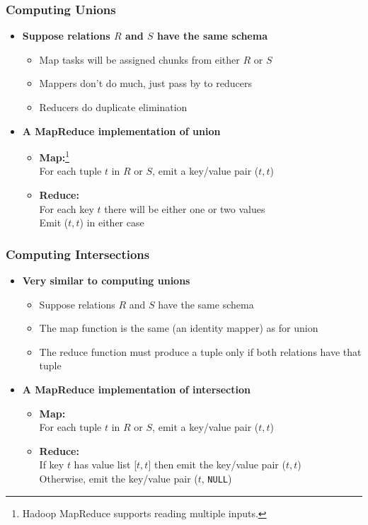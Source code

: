 \documentclass{beamer}
\newcommand{\bi}{\begin{itemize}}
\newcommand{\ei}{\end{itemize}}
\newcommand{\ii}{\item}
\newcommand*{\mygreen}[1]{\textcolor{mygreen}{#1}}
\begin{document}

\begin{frame}
\frametitle{Computing Unions}
\bi
\ii \textbf{Suppose relations $R$ and $S$ have the same schema}
\bi
\ii Map tasks will be assigned chunks from either $R$ or $S$
\ii Mappers don’t do much, just pass by to reducers
\ii Reducers do duplicate elimination
\ei
\ei

\bi
\ii \textbf{A MapReduce implementation of union}
\bi
\ii \mygreen{\textbf{Map:}}\footnote{Hadoop MapReduce supports reading multiple inputs.} \\
For each tuple $t$ in $R$ or $S$, emit a key/value pair ($t, t$)
\ii \mygreen{\textbf{Reduce:}}\\
For each key $t$ there will be either one or two values\\
Emit ($t, t$) in either case
\ei
\ei

\end{frame}



\begin{frame}
\frametitle{Computing Intersections}
\bi
\ii \textbf{Very similar to computing unions}
\bi
\ii Suppose relations $R$ and $S$ have the same schema
\ii The map function is the same (an identity mapper) as for union
\ii The reduce function must produce a tuple only if both relations have that tuple
\ei
\ei

\bi
\ii \textbf{A MapReduce implementation of intersection}
\bi
\ii \mygreen{\textbf{Map:}}\\
For each tuple $t$ in $R$ or $S$, emit a key/value pair ($t, t$)
\ii \mygreen{\textbf{Reduce:}}\\
If key $t$ has value list [$t, t$] then emit the key/value pair ($t, t$)\\
Otherwise, emit the key/value pair ($t$, \texttt{NULL})
\ei
\ei

\end{frame}


\end{document}
